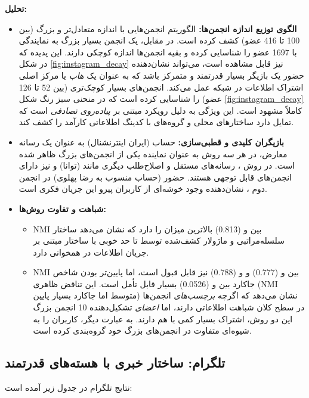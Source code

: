 \documentclass{article}
\begin{document}
	\textbf{تحلیل:}
	\begin{itemize}
		\item \textbf{الگوی توزیع اندازه انجمن‌ها:} الگوریتم  انجمن‌هایی با اندازه متعادل‌تر و بزرگ (بین 100 تا 416 عضو) کشف کرده است. در مقابل،  یک انجمن بسیار بزرگ به نمایندگی  با 1697 عضو را شناسایی کرده و بقیه انجمن‌ها اندازه کوچکی دارند. این پدیده که در شکل \ref{fig:instagram_decay} نیز قابل مشاهده است، می‌تواند نشان‌دهنده حضور یک بازیگر بسیار قدرتمند و متمرکز باشد که به عنوان یک \textit{هاب} یا مرکز اصلی اشتراک اطلاعات در شبکه عمل می‌کند.  انجمن‌های بسیار کوچک‌تری (بین 52 تا 126 عضو) را شناسایی کرده است که در منحنی سبز رنگ شکل \ref{fig:instagram_decay} کاملاً مشهود است. این ویژگی  به دلیل رویکرد مبتنی بر \textit{پیاده‌روی تصادفی} است که تمایل دارد ساختارهای محلی و گروه‌های با کدینگ اطلاعاتی کارآمد را کشف کند.
		\item \textbf{بازیگران کلیدی و قطبی‌سازی:} حساب  (ایران اینترنشنال) به عنوان یک رسانه معارض، در هر سه روش به عنوان نماینده یکی از انجمن‌های بزرگ ظاهر شده است. در روش ، رسانه‌های مستقل و اصلاح‌طلب دیگری مانند  (توانا) و  نیز دارای انجمن‌های قابل توجهی هستند. حضور  (حساب منسوب به رضا پهلوی) در انجمن دوم ، نشان‌دهنده وجود خوشه‌ای از کاربران پیرو این جریان فکری است.
		\item \textbf{شباهت و تفاوت روش‌ها:}
		\begin{itemize}
			\item NMI بین  و  (0.813) بالاترین میزان را دارد که نشان می‌دهد ساختار سلسله‌مراتبی و ماژولار کشف‌شده توسط  تا حد خوبی با ساختار مبتنی بر جریان اطلاعات در  همخوانی دارد.
			\item NMI بین  و  (0.777) و  و  (0.788) نیز قابل قبول است، اما پایین‌تر بودن شاخص جاکارد بین  و  (0.0526) بسیار قابل تأمل است. این تناقض ظاهری (NMI متوسط اما جاکارد بسیار پایین) نشان می‌دهد که اگرچه \textit{برچسب‌های} انجمن‌ها در سطح کلان شباهت اطلاعاتی دارند، اما \textit{اعضای} تشکیل‌دهنده 10 انجمن بزرگ این دو روش، اشتراک بسیار کمی با هم دارند. به عبارت دیگر،  کاربران را به شیوه‌ای متفاوت در انجمن‌های بزرگ خود گروه‌بندی کرده است.
		\end{itemize}
	\end{itemize}
	
	\subsection*{تلگرام: ساختار خبری با هسته‌های قدرتمند}
	نتایج تلگرام در جدول زیر آمده است:
	
\end{document}

